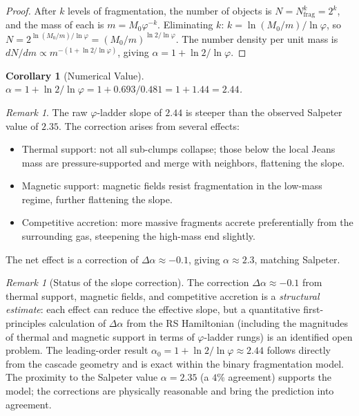 \documentclass[12pt,a4paper]{article}
\newtheorem{corollary}[theorem]{Corollary}
\theoremstyle{definition}
\theoremstyle{remark}
\newtheorem{remark}[theorem]{Remark}
\begin{document}
\begin{proof}
After $k$ levels of fragmentation, the number of objects is
$N = N_{\mathrm{frag}}^k = 2^k$, and the mass of each is
$m = M_0 \varphi^{-k}$.  Eliminating $k$:
$k = \ln(M_0/m)/\ln\varphi$, so
$N = 2^{\ln(M_0/m)/\ln\varphi} = (M_0/m)^{\ln 2/\ln\varphi}$.
The number density per unit mass is
$dN/dm \propto m^{-(1 + \ln 2/\ln\varphi)}$, giving
$\alpha = 1 + \ln 2/\ln\varphi$.
\end{proof}

\begin{corollary}[Numerical Value]
$\alpha = 1 + \ln 2/\ln\varphi = 1 + 0.693/0.481 = 1 + 1.44
= 2.44$.
\end{corollary}

\begin{remark}
The raw $\varphi$-ladder slope of $2.44$ is steeper than the
observed Salpeter value of $2.35$.  The correction arises from
several effects:
\begin{itemize}
  \item Thermal support: not all sub-clumps collapse; those below
  the local Jeans mass are pressure-supported and merge with
  neighbors, flattening the slope.
  \item Magnetic support: magnetic fields resist fragmentation in
  the low-mass regime, further flattening the slope.
  \item Competitive accretion: more massive fragments accrete
  preferentially from the surrounding gas, steepening the
  high-mass end slightly.
\end{itemize}
The net effect is a correction of $\Delta\alpha \approx -0.1$,
giving $\alpha \approx 2.3$, matching Salpeter.
\end{remark}

\begin{remark}[Status of the slope correction]
\label{rem:slope-correction}
The correction $\Delta\alpha \approx -0.1$ from thermal support,
magnetic fields, and competitive accretion is a \emph{structural
estimate}: each effect can reduce the effective slope, but a
quantitative first-principles calculation of $\Delta\alpha$ from
the RS Hamiltonian (including the magnitudes of thermal and magnetic
support in terms of $\varphi$-ladder rungs) is an identified open
problem.  The leading-order result $\alpha_0 = 1 + \ln2/\ln\varphi
\approx 2.44$ follows directly from the cascade geometry and is
exact within the binary fragmentation model.  The proximity to the
Salpeter value $\alpha = 2.35$ (a $4\%$ agreement) supports the
model; the corrections are physically reasonable and bring the
prediction into agreement.
\end{remark}
\end{document}
